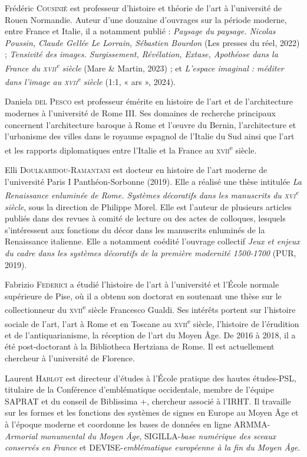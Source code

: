 \documentclass[12pt,twoside,openany]{book}
\begin{document}
Frédéric \textsc{Cousinié} est professeur d’histoire et théorie de l’art à l’université de Rouen Normandie. Auteur d’une douzaine d’ouvrages sur la période moderne, entre France et Italie, il a notamment publié : \textit{Paysage du paysage. Nicolas Poussin, Claude Gellée Le Lorrain, Sébastien Bourdon }(Les presses du réel, 2022) ; \textit{Tensivité des images. Surgissement, Révélation, Extase, Apothéose dans la France du }\textit{\textsc{xvii}}\textit{\textsuperscript{e}}\textit{ siècle} (Mare \& Martin, 2023) ; et \textit{L’espace imaginal : méditer dans l’image au }\textit{\textsc{xvii}}\textit{\textsuperscript{e}}\textit{ siècle} (1:1, « ars », 2024).

Daniela \textsc{del Pesco} est professeur émérite en histoire de l’art et de l’architecture modernes à l’université de Rome III. Ses domaines de recherche principaux concernent l’architecture baroque à Rome et l’œuvre du Bernin, l’architecture et l’urbanisme des villes dans le royaume espagnol de l’Italie du Sud ainsi que l’art et les rapports diplomatiques entre l’Italie et la France au \textsc{xvii}\textsuperscript{e} siècle.

Elli \textsc{Doulkaridou-Ramantani} est docteur en histoire de l’art moderne de l’université Paris I Panthéon-Sorbonne (2019). Elle a réalisé une thèse intitulée \textit{La Renaissance enluminée de Rome. Systèmes décoratifs dans les manuscrits du }\textit{\textsc{xvi}}\textit{\textsuperscript{e}}\textit{ siècle}, sous la direction de Philippe Morel. Elle est l’auteur de plusieurs articles publiés dans des revues à comité de lecture ou des actes de colloques, lesquels s’intéressent aux fonctions du décor dans les manuscrits enluminés de la Renaissance italienne. Elle a notamment coédité l’ouvrage collectif \textit{Jeux et enjeux du cadre dans les systèmes décoratifs de la première modernité 1500-1700} (PUR, 2019). 

Fabrizio \textsc{Federici} a étudié l’histoire de l’art à l’université et l’École normale supérieure de Pise, où il a obtenu son doctorat en soutenant une thèse sur le collectionneur du \textsc{xvii}\textsuperscript{e} siècle Francesco Gualdi. Ses intérêts portent sur l'histoire sociale de l’art, l’art à Rome et en Toscane au \textsc{xvii}\textsuperscript{e} siècle, l’histoire de l’érudition et de l’antiquarianisme, la réception de l’art du Moyen Âge. De 2016 à 2018, il a été post-doctorant à la Bibliotheca Hertziana de Rome. Il est actuellement chercheur à l’université de Florence.

Laurent \textsc{Hablot} est directeur d’études à l’École pratique des hautes études-PSL, titulaire de la Conférence d’emblématique occidentale, membre de l’équipe SAPRAT et du conseil de Biblissima +, chercheur associé à l’IRHT. Il travaille sur les formes et les fonctions des systèmes de signes en Europe au Moyen Âge et à l'époque moderne et coordonne les bases de données en ligne ARMMA-\textit{Armorial monumental du Moyen Âge}, SIGILLA-\textit{base numérique des sceaux conservés en France} et DEVISE-\textit{emblématique européenne à la fin du Moyen Âge}.
\end{document}
